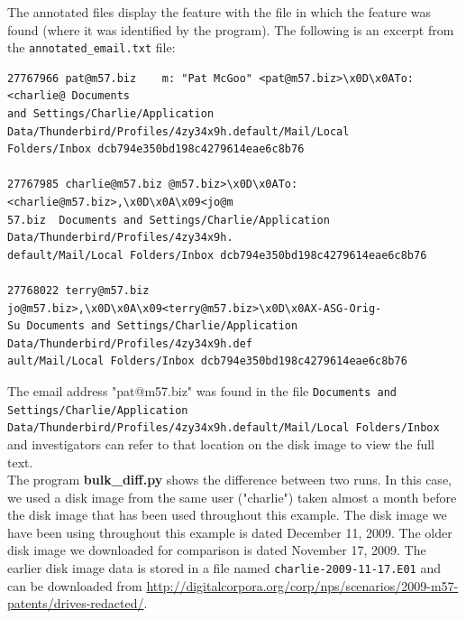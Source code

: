 The annotated files display the feature with the file in which the feature was found (where it was identified by the program). The following is an excerpt from the \texttt{annotated\_email.txt} file:
\lstset{style=customfile}
\begin{lstlisting}
27767966 pat@m57.biz	m: "Pat McGoo" <pat@m57.biz>\x0D\x0ATo: <charlie@ Documents
and Settings/Charlie/Application Data/Thunderbird/Profiles/4zy34x9h.default/Mail/Local
Folders/Inbox dcb794e350bd198c4279614eae6c8b76

27767985 charlie@m57.biz @m57.biz>\x0D\x0ATo: <charlie@m57.biz>,\x0D\x0A\x09<jo@m
57.biz	Documents and Settings/Charlie/Application Data/Thunderbird/Profiles/4zy34x9h.
default/Mail/Local Folders/Inbox dcb794e350bd198c4279614eae6c8b76

27768022 terry@m57.biz jo@m57.biz>,\x0D\x0A\x09<terry@m57.biz>\x0D\x0AX-ASG-Orig-
Su Documents and Settings/Charlie/Application Data/Thunderbird/Profiles/4zy34x9h.def
ault/Mail/Local Folders/Inbox dcb794e350bd198c4279614eae6c8b76
\end{lstlisting}
The email address "pat@m57.biz" was found in the file \texttt{Documents and Settings/Charlie/}\newline\texttt{Application Data/Thunderbird/Profiles/4zy34x9h.default/Mail/Local Folders/Inbox} and investigators can refer to that location on the disk image to view the full text.\\

The program \textbf{bulk\_diff.py} shows the difference between two \bulk runs. In this case, we used a disk image from the same user ("charlie") taken almost a month before the disk image that has been used throughout this example. The disk image we have been using throughout this example is dated December 11, 2009. The older disk image we downloaded for comparison is dated November 17, 2009.  The earlier disk image data is stored in a file named \texttt{charlie-2009-11-17.E01} and can be downloaded from \url{http://digitalcorpora.org/corp/nps/scenarios/2009-m57-patents/drives-redacted/}.\\

